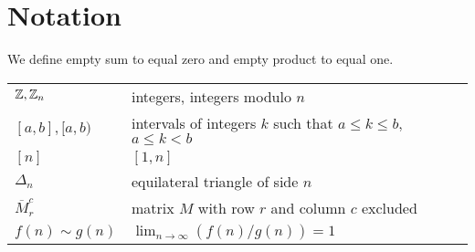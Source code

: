 \chapter*{Notation}

\bigskip

We define empty sum to equal zero and empty product to equal one.
\bigskip

\noindent
 \begin{tabularx}{\linewidth}{l X}
 $\mathbb Z, \mathbb Z_n$ & integers, integers modulo $n$ \\
 $[a,b], [a,b)$ & intervals of integers $k$ such that $a \leq k \leq b$, $a \leq k < b$ \\
 $[n]$ & $[1,n]$ \\
 $\Delta_n$ & equilateral triangle of side $n$ \\
 $\overbar{M}_r^c$ & matrix $M$ with row $r$ and column $c$ excluded \\
 $f(n) \sim g(n)$ & $\lim_{n \rightarrow \infty} (f(n)/g(n)) = 1$ \\
 \end{tabularx}